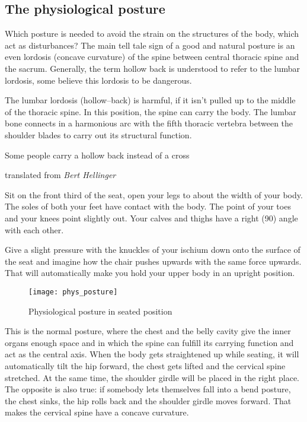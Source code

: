 \documentclass[../main.tex]{subfiles}
\begin{document}
\subsection{The physiological posture}

Which posture is needed to avoid the strain on the structures of the body, which act as disturbances?
The main tell tale sign of a good and natural posture is an {even lordosis} (concave curvature) of the spine between central thoracic spine and the sacrum.
Generally, the term hollow back is understood to refer to the lumbar lordosis, some believe this lordosis to be dangerous.

The lumbar lordosis (hollow--back) is harmful, if it isn't {pulled up to the middle of the thoracic spine}.
In this position, the spine can carry the body.
The lumbar bone connects in a harmonious arc with the fifth thoracic vertebra between the shoulder blades to carry out its structural function.

\epigraph{Some people carry a hollow back instead of a cross}{translated from \textit{Bert Hellinger}}

Sit on the {front third of the seat}, {open your legs} to about the width of your body. \label{Posture:Sitting}
The soles of both your feet have {contact with the body}.
The point of your toes and your knees point slightly out. 
Your {calves and thighs} have a {right (90\degree) angle} with each other. 

Give a slight {pressure} with the knuckles of your ischium {down} onto the surface of the seat and imagine how the {chair pushes upwards} with the same force upwards.
That will automatically make you hold your upper body in an upright position.

        \begin{figure}[htb!]
          \centering
          \texttt{[image: phys\_posture]}
           \caption{Physiological posture in seated position}
        \end{figure}

This is the {normal posture}, where the chest and the belly cavity give the inner {organs enough space} and in which the {spine} can fulfill its carrying function and act as the {central axis}. 
When the body gets straightened up while seating, it will automatically {tilt the hip forward}, the {chest gets lifted} and the {cervical spine stretched}.
At the same time, the shoulder girdle will be placed in the right place.
The opposite is also true: if somebody lets themselves fall into a {bend posture}, the {chest sinks}, the {hip rolls back} and the {shoulder girdle moves forward}. That makes the {cervical spine} have a {concave curvature}.
\end{document}
